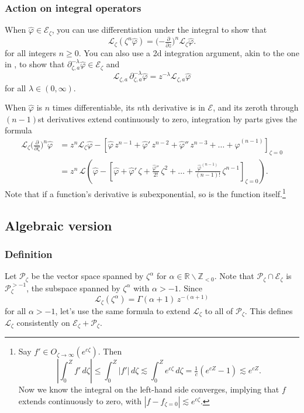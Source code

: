 \documentclass{article}
\theoremstyle{plain}
\newcommand{\Z}{\mathbb{Z}}
\newcommand{\R}{\mathbb{R}}
\newcommand{\laplace}{\mathcal{L}}
\newcommand{\fracderiv}[3]{\partial^{#1}_{#2, #3}}
\begin{document}
\subsubsection{Action on integral operators}\label{L-int-op}
When $\hat{\varphi} \in \mathcal{E}_\zeta$, you can use differentiation under the integral to show that~\cite[Theorem~1.34]{laplace-tfm}
\begin{equation}%
\laplace_\zeta (\zeta^n \hat{\varphi}) = \big({-\tfrac{\partial}{\partial z}}\big)^n \laplace_\zeta \hat{\varphi}.
\end{equation}
for all integers $n \ge 0$. You can also use a 2d integration argument, akin to the one in \cite[Theorem~2.39]{laplace-tfm}, to show that $\fracderiv{-\lambda}{\zeta}{a} \hat{\varphi} \in \mathcal{E}_\zeta$ and
\[ \laplace_{\zeta, a}\,\fracderiv{-\lambda}{\zeta}{a} \hat{\varphi} = z^{-\lambda} \laplace_{\zeta, a} \hat{\varphi} \]
for all $\lambda \in (0, \infty)$.

\color{violet}
When $\hat{\varphi}$ is $n$ times differentiable, its $n$th derivative is in $\mathcal{E}$, and its zeroth through $(n - 1)$st derivatives extend continuously to zero, integration by parts gives the formula
\begin{align}\label{id:L-diff}
\laplace_\zeta \big(\tfrac{\partial}{\partial \zeta}\big)^n \hat{\varphi} & = z^n \laplace_\zeta \hat{\varphi} - \left[ \hat{\varphi}\,z^{n-1} + \hat{\varphi}'\,z^{n-2} + \hat{\varphi}''\,z^{n-3} + \ldots + \hat{\varphi}^{(n-1)} \right]_{\zeta = 0} \\
& = z^n\,\laplace\left( \hat{\varphi} - \left[ \hat{\varphi} + \hat{\varphi}'\,\zeta + \tfrac{\hat{\varphi}''}{2!}\,\zeta^2 + \ldots + \tfrac{\hat{\varphi}^{(n-1)}}{(n-1)!}\,\zeta^{n-1} \right]_{\zeta = 0} \right). \nonumber
\end{align}
Note that if a function's derivative is subexponential, so is the function itself.\footnote{Say $f' \in O_{\zeta \to \infty}(e^{c\zeta})$. Then \[ \left|\int_0^Z f'\,d\zeta\right| \le \int_0^Z |f'|\,d\zeta \lesssim \int_0^Z e^{c\zeta}\,d\zeta = \tfrac{1}{c}(e^{cZ} - 1) \lesssim e^{cZ}.\] Now we know the integral on the left-hand side converges, implying that $f$ extends continuously to zero, with $|f - f_{\zeta = 0}| \lesssim e^{c\zeta}$.}
\subsection{Algebraic version}
\subsubsection{Definition}
Let $\mathcal{P}_\zeta$ be the vector space spanned by $\zeta^\alpha$ for $\alpha \in \R \smallsetminus \Z_{< 0}$. Note that $\mathcal{P}_\zeta \cap \mathcal{E}_\zeta$ is $\mathcal{P}_\zeta^{> -1}$, the subspace spanned by $\zeta^\alpha$ with $\alpha > -1$. Since
\[ \laplace_\zeta(\zeta^\alpha) = \Gamma(\alpha+1)\,z^{-(\alpha + 1)} \]
for all $\alpha > -1$, let's use the same formula to extend $\laplace_\zeta$ to all of $\mathcal{P}_\zeta$. This defines $\laplace_\zeta$ consistently on $\mathcal{E}_\zeta + \mathcal{P}_\zeta$.
\end{document}
